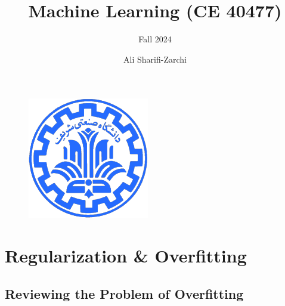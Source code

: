 \documentclass[serif, aspectratio=169]{beamer}
\author{Ali Sharifi-Zarchi}
\title{Machine Learning (CE 40477)}
\subtitle{Fall 2024}
\institute{
    CE Department \\
    Sharif University of Technology
}
\begin{document}
\begin{frame}
    \titlepage
    \vspace*{-0.6cm}
    \begin{figure}[htpb]
        \begin{center}
            \includegraphics[keepaspectratio, scale=0.25]{pic/sharif-main-logo.png}
        \end{center}
    \end{figure}
\end{frame}

\begin{frame}    
\tableofcontents[sectionstyle=show,
subsectionstyle=show/shaded/hide,
subsubsectionstyle=show/shaded/hide]
\end{frame}

\section{Regularization \& Overfitting}

\subsection{Reviewing the Problem of Overfitting}
\end{document}
